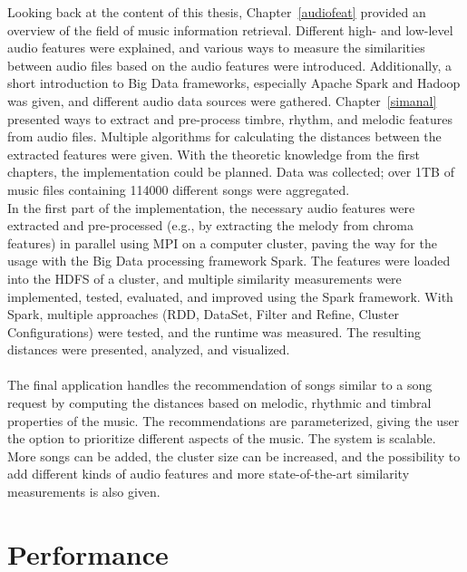 Looking back at the content of this thesis, Chapter~\ref{audiofeat} provided an overview of the field of music information retrieval. Different high- and low-level audio features were explained, and various ways to measure the similarities between audio files based on the audio features were introduced. Additionally, a short introduction to Big Data frameworks, especially Apache Spark and Hadoop was given, and different audio data sources were gathered. Chapter~\ref{simanal} presented ways to extract and pre-process timbre, rhythm, and melodic features from audio files. Multiple algorithms for calculating the distances between the extracted features were given. With the theoretic knowledge from the first chapters, the implementation could be planned. Data was collected; over 1TB of music files containing 114000 different songs were aggregated.\\ 
In the first part of the implementation, the necessary audio features were extracted and pre-processed (e.g., by extracting the melody from chroma features) in parallel using MPI on a computer cluster, paving the way for the usage with the Big Data processing framework Spark.
The features were loaded into the HDFS of a cluster, and multiple similarity measurements were implemented, tested, evaluated, and improved using the Spark framework. With Spark, multiple approaches (RDD, DataSet, Filter and Refine, Cluster Configurations) were tested, and the runtime was measured. The resulting distances were presented, analyzed, and visualized.\\
\ \\
The final application handles the recommendation of songs similar to a song request by computing the distances based on melodic, rhythmic and timbral properties of the music. The recommendations are parameterized, giving the user the option to prioritize different aspects of the music. The system is scalable. More songs can be added, the cluster size can be increased, and the possibility to add different kinds of audio features and more state-of-the-art similarity measurements is also given. 

\section{Performance}

